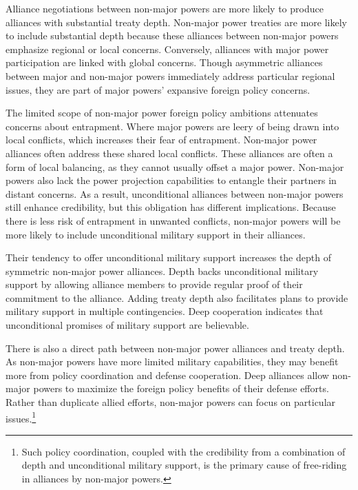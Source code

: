 \documentclass[12pt]{article}
\begin{document}
Alliance negotiations between non-major powers are more likely to produce alliances with substantial treaty depth. 
Non-major power treaties are more likely to include substantial depth because these alliances between non-major powers emphasize regional or local concerns.
Conversely, alliances with major power participation are linked with global concerns.
Though asymmetric alliances between major and non-major powers immediately address particular regional issues, they are part of major powers' expansive foreign policy concerns.  


The limited scope of non-major power foreign policy ambitions attenuates concerns about entrapment. 
Where major powers are leery of being drawn into local conflicts, which increases their fear of entrapment.
Non-major power alliances often address these shared local conflicts. 
These alliances are often a form of local balancing, as they cannot usually offset a major power. 
Non-major powers also lack the power projection capabilities to entangle their partners in distant concerns. 
As a result, unconditional alliances between non-major powers still enhance credibility, but this obligation has different implications. 
Because there is less risk of entrapment in unwanted conflicts, non-major powers will be more likely to include unconditional military support in their alliances. 


Their tendency to offer unconditional military support increases the depth of symmetric non-major power alliances. 
Depth backs unconditional military support by allowing alliance members to provide regular proof of their commitment to the alliance. 
Adding treaty depth also facilitates plans to provide military support in multiple contingencies.
Deep cooperation indicates that unconditional promises of military support are believable.  


There is also a direct path between non-major power alliances and treaty depth. 
As non-major powers have more limited military capabilities, they may benefit more from policy coordination and defense cooperation. 
Deep alliances allow non-major powers to maximize the foreign policy benefits of their defense efforts. 
Rather than duplicate allied efforts, non-major powers can focus on particular issues.\footnote{Such policy coordination, coupled with the credibility from a combination of depth and unconditional military support, is the primary cause of free-riding in alliances by non-major powers.} 
\end{document}
